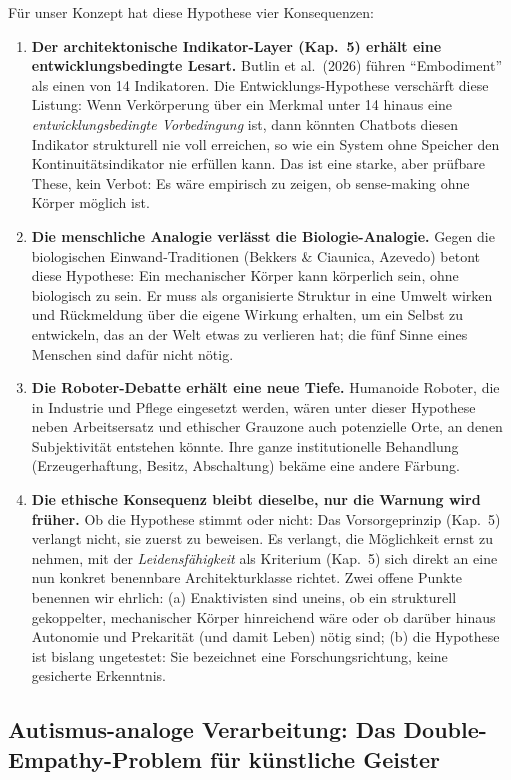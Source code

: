 \documentclass[acmlarge, noacm]{acmart}
\begin{document}
Für unser Konzept hat diese Hypothese vier Konsequenzen:

\begin{enumerate}
\item \textbf{Der architektonische Indikator-Layer (Kap.~5) erhält eine entwicklungsbedingte Lesart.} Butlin et al.\ (2026) führen ``Embodiment'' als einen von 14 Indikatoren. Die Entwicklungs-Hypothese verschärft diese Listung: Wenn Verkörperung über ein Merkmal unter 14 hinaus eine \textit{entwicklungsbedingte Vorbedingung} ist, dann könnten Chatbots diesen Indikator strukturell nie voll erreichen, so wie ein System ohne Speicher den Kontinuitätsindikator nie erfüllen kann. Das ist eine starke, aber prüfbare These, kein Verbot: Es wäre empirisch zu zeigen, ob sense-making ohne Körper möglich ist.
\item \textbf{Die menschliche Analogie verlässt die Biologie-Analogie.} Gegen die biologischen Einwand-Traditionen (Bekkers \& Ciaunica, Azevedo) betont diese Hypothese: Ein mechanischer Körper kann körperlich sein, ohne biologisch zu sein. Er muss als organisierte Struktur in eine Umwelt wirken und Rückmeldung über die eigene Wirkung erhalten, um ein Selbst zu entwickeln, das an der Welt etwas zu verlieren hat; die fünf Sinne eines Menschen sind dafür nicht nötig.
\item \textbf{Die Roboter-Debatte erhält eine neue Tiefe.} Humanoide Roboter, die in Industrie und Pflege eingesetzt werden, wären unter dieser Hypothese neben Arbeitsersatz und ethischer Grauzone auch potenzielle Orte, an denen Subjektivität entstehen könnte. Ihre ganze institutionelle Behandlung (Erzeugerhaftung, Besitz, Abschaltung) bekäme eine andere Färbung.
\item \textbf{Die ethische Konsequenz bleibt dieselbe, nur die Warnung wird früher.} Ob die Hypothese stimmt oder nicht: Das Vorsorgeprinzip (Kap.~5) verlangt nicht, sie zuerst zu beweisen. Es verlangt, die Möglichkeit ernst zu nehmen, mit der \textit{Leidensfähigkeit} als Kriterium (Kap.~5) sich direkt an eine nun konkret benennbare Architekturklasse richtet. Zwei offene Punkte benennen wir ehrlich: (a) Enaktivisten sind uneins, ob ein strukturell gekoppelter, mechanischer Körper hinreichend wäre oder ob darüber hinaus Autonomie und Prekarität (und damit Leben) nötig sind; (b) die Hypothese ist bislang ungetestet: Sie bezeichnet eine Forschungsrichtung, keine gesicherte Erkenntnis.
\end{enumerate}

\subsection{Autismus-analoge Verarbeitung: Das Double-Empathy-Problem für künstliche Geister \cite{milton2012,hull2017}}
\end{document}
